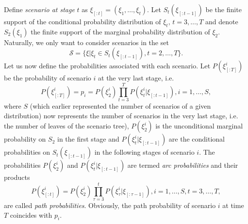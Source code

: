Define \textit{scenario at stage} $t$ as $\xi_{[:t]} = (\xi_1,\dots,\xi_t)$.
Let $S_t(\xi_{[:t-1]})$ be the finite support of the conditional probability distribution of $\xi_t, \, t=3,\dots,T$ and denote $S_2(\xi_{1})$ the finite support of the marginal probability distribution of $\xi_2$. Naturally, we only want to consider scenarios in the set 
\begin{equation*}
\mathcal{S}=\{\xi|\xi_t \in S_t(\xi_{[:t-1]}), t=2,\dots,T\}.
\end{equation*} 
Let us now define the probabilities associated with each scenario. Let $P(\xi_{[:T]}^i)$ be the probability of scenario $i$ at the very last stage, i.e.
\begin{equation}
\label{eq:scenario_probabilities}
P(\xi_{[:T]}^i)=p_i=P(\xi_2^i)\prod_{t=3}^{T}P(\xi_t^i|\xi_{[:t-1]}), i=1,\dots,S,
\end{equation}
where $S$ (which earlier represented the number of scenarios of a given distribution) now represents the number of scenarios in the very last stage, i.e. the number of leaves of the scenario tree), $P(\xi_2^i)$ is the unconditional marginal probability on $S_2$ in the first stage and $P(\xi_t^i|\xi_{[:t-1]})$ are the conditional probabilities on $S_t(\xi_{[:t-1]})$ in the following stages of scenario $i$. The probabilities $P(\xi_2^i)$ and $P(\xi_t^i|\xi_{[:t-1]})$ are termed \textit{arc probabilities} and their products
\begin{equation}
P(\xi_{[:t]}^i)=P(\xi_2^i)\prod_{\tau=3}^{t}P(\xi_\tau^i|\xi_{[:\tau-1]}), i=1,\dots,S, t=3,\dots,T,
\end{equation}
are called \textit{path probabilities}. Obviously, the path probability of scenario $i$ at time $T$ coincides with $p_i$.

